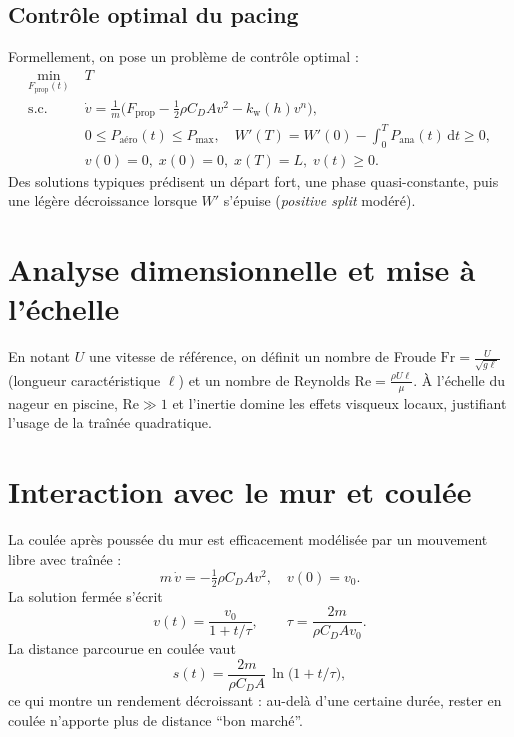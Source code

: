 \documentclass[12pt,a4paper]{article}
\newcommand{\dd}{\mathrm{d}}
\begin{document}
\subsection{Contrôle optimal du pacing}
Formellement, on pose un problème de contrôle optimal :
\begin{align}
 \min_{F_{\mathrm{prop}}(t)}\; &T \\
 \text{s.c. }\; &\dot v = \frac{1}{m}\Big(F_{\mathrm{prop}} - \tfrac{1}{2}\rho C_D A v^2 - k_\mathrm{w}(h)v^n\Big), \\
 &0\le P_\mathrm{aéro}(t)\le P_{\max},\quad W'(T)=W'(0)-\int_0^T P_\mathrm{ana}(t)\,\dd t\ge 0, \\
 &v(0)=0,\; x(0)=0,\; x(T)=L,\; v(t)\ge 0.
 \end{align}
Des solutions typiques prédisent un départ fort, une phase quasi-constante, puis une légère décroissance lorsque $W'$ s'épuise (\emph{positive split} modéré).

\section{Analyse dimensionnelle et mise à l'échelle}
En notant $U$ une vitesse de référence, on définit un nombre de Froude $\mathrm{Fr}=\frac{U}{\sqrt{g\ell}}$ (longueur caractéristique $\ell$) et un nombre de Reynolds $\mathrm{Re}=\frac{\rho U \ell}{\mu}$. À l'échelle du nageur en piscine, $\mathrm{Re}\gg 1$ et l'inertie domine les effets visqueux locaux, justifiant l'usage de la traînée quadratique.

\section{Interaction avec le mur et coulée}
La coulée après poussée du mur est efficacement modélisée par un mouvement libre avec traînée :
\begin{equation}
 m\,\dot v = - \tfrac{1}{2}\rho C_D A v^2, \quad v(0)=v_0.
 \end{equation}
La solution fermée s'écrit
\begin{equation}
 v(t) = \frac{v_0}{1+ t/\tau}, \qquad \tau = \frac{2m}{\rho C_D A v_0}.
 \end{equation}
La distance parcourue en coulée vaut
\begin{equation}
 s(t) = \frac{2m}{\rho C_D A}\,\ln\big(1+t/\tau\big),
 \end{equation}
ce qui montre un rendement décroissant : au-delà d'une certaine durée, rester en coulée n'apporte plus de distance ``bon marché''.
\end{document}
